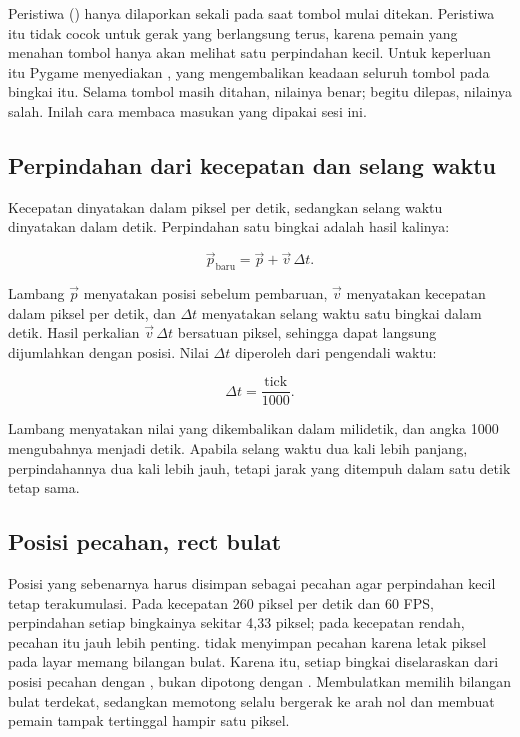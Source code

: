 Peristiwa ()  hanya dilaporkan sekali pada saat
tombol mulai ditekan. Peristiwa itu tidak cocok untuk gerak yang berlangsung
terus, karena pemain yang menahan tombol hanya akan melihat satu perpindahan
kecil. Untuk keperluan itu Pygame menyediakan
, yang mengembalikan keadaan seluruh tombol pada
bingkai itu. Selama tombol masih ditahan, nilainya benar; begitu dilepas,
nilainya salah. Inilah cara membaca masukan yang dipakai sesi ini.

\subsection*{Perpindahan dari kecepatan dan selang waktu}

Kecepatan dinyatakan dalam piksel per detik, sedangkan selang waktu dinyatakan
dalam detik. Perpindahan satu bingkai adalah hasil kalinya:

\[
\vec{p}_{\text{baru}} = \vec{p} + \vec{v}\,\Delta t.
\]

Lambang $\vec{p}$ menyatakan posisi sebelum pembaruan, $\vec{v}$ menyatakan
kecepatan dalam piksel per detik, dan $\Delta t$ menyatakan selang waktu satu
bingkai dalam detik. Hasil perkalian $\vec{v}\,\Delta t$ bersatuan piksel,
sehingga dapat langsung dijumlahkan dengan posisi. Nilai $\Delta t$ diperoleh
dari pengendali waktu:

\[
\Delta t = \frac{\text{tick}}{1000}.
\]

Lambang  menyatakan nilai yang dikembalikan
 dalam milidetik, dan angka 1000 mengubahnya menjadi
detik. Apabila selang waktu dua kali lebih panjang, perpindahannya dua kali
lebih jauh, tetapi jarak yang ditempuh dalam satu detik tetap sama.

\subsection*{Posisi pecahan, rect bulat}

Posisi yang sebenarnya harus disimpan sebagai pecahan agar perpindahan kecil
tetap terakumulasi. Pada kecepatan 260 piksel per detik dan 60 FPS,
perpindahan setiap bingkainya sekitar 4,33 piksel; pada kecepatan rendah,
pecahan itu jauh lebih penting.  tidak menyimpan pecahan karena
letak piksel pada layar memang bilangan bulat. Karena itu, setiap bingkai
 diselaraskan dari posisi pecahan dengan , bukan
dipotong dengan . Membulatkan memilih bilangan bulat terdekat,
sedangkan memotong selalu bergerak ke arah nol dan membuat pemain tampak
tertinggal hampir satu piksel.

